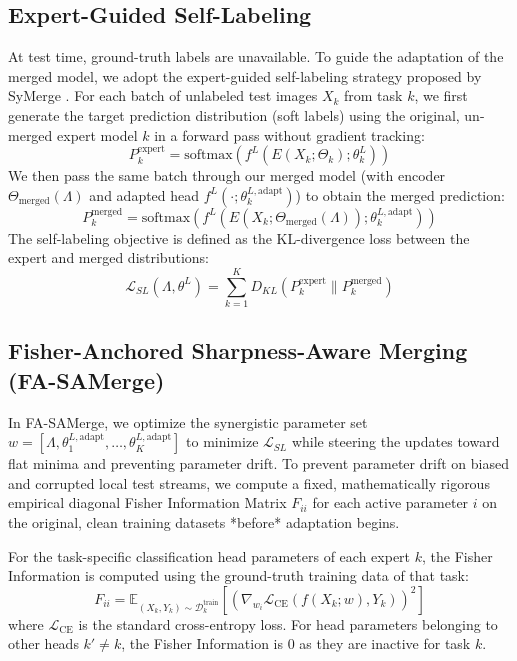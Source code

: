 \documentclass{article}
\theoremstyle{plain}
\theoremstyle{definition}
\theoremstyle{remark}
\begin{document}
\subsection{Expert-Guided Self-Labeling}
At test time, ground-truth labels are unavailable. To guide the adaptation of the merged model, we adopt the expert-guided self-labeling strategy proposed by SyMerge \cite{Jung2025}. For each batch of unlabeled test images $X_k$ from task $k$, we first generate the target prediction distribution (soft labels) using the original, un-merged expert model $k$ in a forward pass without gradient tracking:
\begin{equation}
    P_k^{\text{expert}} = \text{softmax}(f^L(E(X_k; \Theta_k); \theta_k^L))
\end{equation}
We then pass the same batch through our merged model (with encoder $\Theta_{\text{merged}}(\Lambda)$ and adapted head $f^L(\cdot; \theta_k^{L,\text{adapt}})$) to obtain the merged prediction:
\begin{equation}
    P_k^{\text{merged}} = \text{softmax}(f^L(E(X_k; \Theta_{\text{merged}}(\Lambda)); \theta_k^{L,\text{adapt}}))
\end{equation}
The self-labeling objective is defined as the KL-divergence loss between the expert and merged distributions:
\begin{equation}
    \mathcal{L}_{SL}(\Lambda, \theta^L) = \sum_{k=1}^K D_{KL}(P_k^{\text{expert}} \parallel P_k^{\text{merged}})
\end{equation}

\subsection{Fisher-Anchored Sharpness-Aware Merging (FA-SAMerge)}
In FA-SAMerge, we optimize the synergistic parameter set $w = [\Lambda, \theta_1^{L,\text{adapt}}, \dots, \theta_K^{L,\text{adapt}}]$ to minimize $\mathcal{L}_{SL}$ while steering the updates toward flat minima and preventing parameter drift.
To prevent parameter drift on biased and corrupted local test streams, we compute a fixed, mathematically rigorous empirical diagonal Fisher Information Matrix $F_{ii}$ for each active parameter $i$ on the original, clean training datasets *before* adaptation begins. 

For the task-specific classification head parameters of each expert $k$, the Fisher Information is computed using the ground-truth training data of that task:
\begin{equation}
    F_{ii} = \mathbb{E}_{(X_k, Y_k) \sim \mathcal{D}_k^{\text{train}}} \left[ \left( \nabla_{w_i} \mathcal{L}_{\text{CE}}(f(X_k; w), Y_k) \right)^2 \right]
\end{equation}
where $\mathcal{L}_{\text{CE}}$ is the standard cross-entropy loss. For head parameters belonging to other heads $k' \neq k$, the Fisher Information is 0 as they are inactive for task $k$.
\end{document}
